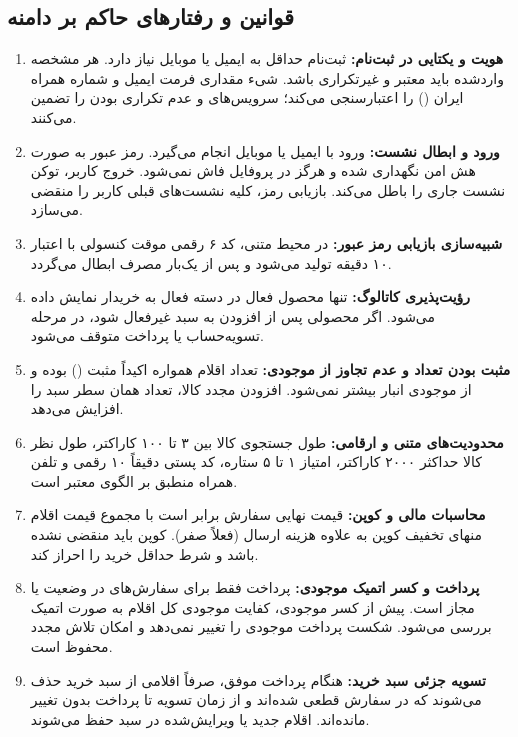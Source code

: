 \documentclass[11pt,a4paper]{article}
\begin{document}
\subsection{قوانین و رفتارهای حاکم بر دامنه }
\begin{enumerate}
    \item \textbf{هویت و یکتایی در ثبت‌نام:} ثبت‌نام حداقل به ایمیل یا موبایل نیاز دارد. هر مشخصه واردشده باید معتبر و غیرتکراری باشد. شیء مقداری  فرمت  ایمیل و شماره همراه ایران () را اعتبارسنجی می‌کند؛ سرویس‌های  و  عدم تکراری بودن را تضمین می‌کنند.
    \item \textbf{ورود و ابطال نشست:} ورود با ایمیل یا موبایل انجام می‌گیرد. رمز عبور به صورت هش امن نگهداری شده و هرگز در پروفایل فاش نمی‌شود. خروج کاربر، توکن نشست جاری را باطل می‌کند. بازیابی رمز، کلیه نشست‌های قبلی کاربر را منقضی می‌سازد.
    \item \textbf{شبیه‌سازی بازیابی رمز عبور:} در محیط متنی، کد ۶ رقمی موقت کنسولی با اعتبار ۱۰ دقیقه تولید می‌شود و پس از یک‌بار مصرف ابطال می‌گردد.
    \item \textbf{رؤیت‌پذیری کاتالوگ:} تنها محصول فعال در دسته فعال به خریدار نمایش داده می‌شود. اگر محصولی پس از افزودن به سبد غیرفعال شود، در مرحله تسویه‌حساب یا پرداخت متوقف می‌شود.
    \item \textbf{مثبت بودن تعداد و عدم تجاوز از موجودی:} تعداد اقلام همواره اکیداً مثبت () بوده و از موجودی انبار بیشتر نمی‌شود. افزودن مجدد کالا، تعداد همان سطر سبد را افزایش می‌دهد.
    \item \textbf{محدودیت‌های متنی و ارقامی:} طول جستجوی کالا بین ۳ تا ۱۰۰ کاراکتر، طول نظر کالا حداکثر ۲۰۰۰ کاراکتر، امتیاز ۱ تا ۵ ستاره، کد پستی دقیقاً ۱۰ رقمی و تلفن همراه منطبق بر الگوی معتبر است.
    \item \textbf{محاسبات مالی و کوپن:} قیمت نهایی سفارش برابر است با مجموع قیمت اقلام منهای تخفیف کوپن به علاوه هزینه ارسال (فعلاً صفر). کوپن باید منقضی نشده باشد و شرط حداقل خرید را احراز کند.
    \item \textbf{پرداخت و کسر اتمیک موجودی:} پرداخت فقط برای سفارش‌های در وضعیت  یا  مجاز است. پیش از کسر موجودی، کفایت موجودی کل اقلام به صورت اتمیک بررسی می‌شود. شکست پرداخت موجودی را تغییر نمی‌دهد و امکان تلاش مجدد محفوظ است.
    \item \textbf{تسویه جزئی سبد خرید:} هنگام پرداخت موفق، صرفاً اقلامی از سبد خرید حذف می‌شوند که در سفارش قطعی شده‌اند و از زمان تسویه تا پرداخت بدون تغییر مانده‌اند. اقلام جدید یا ویرایش‌شده در سبد حفظ می‌شوند.

\end{enumerate}
\end{document}
